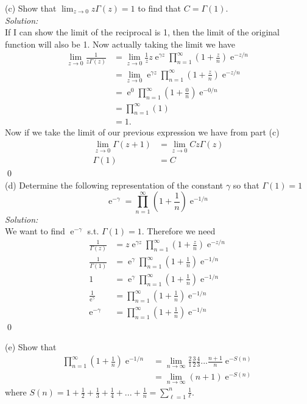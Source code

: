 \documentclass[10pt]{amsart}
\DeclareMathOperator{\E}{e}
\theoremstyle{nonumberplain}
\begin{document}
\begin{enumerate}[label={\bf {\arabic*}:}]
\noindent
(c) Show that $\lim_{z\rightarrow 0} z \Gamma(z) = 1$ to find that $C = \Gamma(1)$. \\

\noindent
\textit{Solution:} \\
If I can show the limit of the reciprocal is 1, then the limit of the original function will also be 1.
Now actually taking the limit we have
\begin{align*}
\lim_{z\rightarrow 0} \frac 1 {z \Gamma(z)}
	&= \lim_{z\rightarrow 0} \frac 1 z z \E^{\gamma z} \prod_{n=1}^\infty \left( 1 + \frac z n \right) \E^{-z / n} \\
	&= \lim_{z\rightarrow 0} \E^{\gamma z} \prod_{n=1}^\infty \left( 1 + \frac z n \right) \E^{-z / n} \\
	&= \E^{0} \prod_{n=1}^\infty \left( 1 + \frac 0 n \right) \E^{-0 / n} \\
	&= \prod_{n=1}^\infty \left( 1\right) \\
	&= 1.
\end{align*}
Now if we take the limit of our previous expression we have from part (c)
\begin{align*}
\lim_{z \rightarrow 0} \Gamma(z + 1) &= \lim_{z \rightarrow 0} Cz\Gamma(z) \\
\Gamma(1) &= C
\end{align*}
\qed \\

\noindent
(d) Determine the following representation of the constant $\gamma$ so that $\Gamma(1) = 1$
$$
\E^{-\gamma} = \prod_{n = 1}^\infty \left(1 + \frac 1 n\right)\E^{-1/n}
$$
\textit{Solution:} \\
We want to find $\E^{-\gamma}$ s.t. $\Gamma(1) = 1$.
Therefore we need
\begin{align*}
\frac 1 {\Gamma(z)} &= z \E^{\gamma z} \prod_{n=1}^\infty \left( 1 + \frac z n \right) \E^{-z / n} \\
\frac 1 {\Gamma(1)} &= \E^\gamma \prod_{n=1}^\infty \left( 1 + \frac 1 n \right) \E^{-1 / n} \\
1 &= \E^\gamma \prod_{n=1}^\infty \left( 1 + \frac 1 n \right) \E^{-1 / n} \\
\frac 1 {\E^\gamma} &= \prod_{n=1}^\infty \left( 1 + \frac 1 n \right) \E^{-1 / n} \\
\E^{-\gamma} &= \prod_{n=1}^\infty \left( 1 + \frac 1 n \right) \E^{-1 / n}
\end{align*}
\qed \\
\newpage

\noindent
(e) Show that
\begin{align*}
\prod_{n=1}^\infty \left(1 + \frac 1 n \right)\E^{-1/n}
	&= \lim_{n\rightarrow\infty} \frac 2 1 \frac 3 2 \frac 4 3 ... \frac {n + 1} n \E^{-S(n)} \\
	&= \lim_{n\rightarrow\infty} (n + 1) \E^{-S(n)}
\end{align*}
where $S(n) = 1 + \frac 1 2 + \frac 1 3 + \frac 1 4 + ... + \frac 1 n = \sum_{\ell=1}^n \frac 1 \ell$. \\


\end{enumerate}
\end{document}
